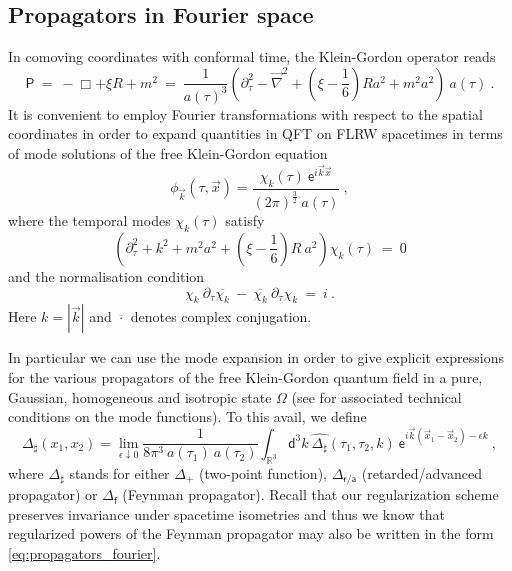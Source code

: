 \documentclass[11pt]{book}
\newcommand{\abs}[1]{\left|#1\right|}
\newcommand{\Psf}{\mathsf{P}}
\newcommand{\asf}{\mathsf{a}}
\newcommand{\dsf}{\mathsf{d}}
\newcommand{\esf}{\mathsf{e}}
\newcommand{\fsf}{\mathsf{f}}
\newcommand{\rsf}{\mathsf{r}}
\theoremstyle{break}
\begin{document}
\subsection{Propagators in Fourier space}


In comoving coordinates with conformal time, the Klein-Gordon operator reads
%
\begin{equation*}
\Psf \ = \ - \Box + \xi R + m^2 \ = \ \frac{1}{a(\tau)^3} \left(\partial^2_\tau-\vec{\nabla}^2 + \left(\xi-\frac16\right)R a^2+m^2a^2\right) \ a(\tau) \ .
\end{equation*}
%
It is convenient to employ Fourier transformations with respect to the spatial coordinates in order to expand quantities in QFT on FLRW spacetimes in terms of mode solutions of the free Klein-Gordon equation
%
\begin{equation*}
\phi_{\vec{k}}(\tau,\vec{x}) = \frac{\chi_k(\tau) \ \esf^{i\vec{k}\vec{x}}}{(2\pi)^{\frac32} \ a(\tau)} \ , 
\end{equation*}
%
where the temporal modes $\chi_k(\tau)$ satisfy
%
\begin{equation}
\left(\partial^2_\tau + k^2 + m^2 a^2 + \left( \xi - \frac16 \right) R \ a^2 \right) \chi_k(\tau) \ = \ 0
\label{eq:modes}
\end{equation}
%
and the normalisation condition
%
\begin{equation}
\chi_k \ \partial_\tau \overline{\chi_k} \ - \ \overline{\chi_k} \ \partial_\tau{\chi_k} \ = \ i \ .
\label{eq:modes_normal}
\end{equation}
%
Here $k = \abs{\vec{k}}$ and $\overline{\cdot}$ denotes complex conjugation.


In particular we can use the mode expansion in order to give explicit expressions for the various propagators of the free Klein-Gordon quantum field in a pure, Gaussian, homogeneous and isotropic state $\Omega$ (see \cite{pinamonti_initial_2011,zschoche_chaplygin_2014}
for associated technical conditions on the mode functions). To this avail, we define
%
\begin{equation}
\Delta_\sharp(x_1,x_2) = \lim_{\epsilon\downarrow 0} \frac{1}{8\pi^3 \ a(\tau_1) \ a(\tau_2)} \int_{\mathbb{R}^3} \dsf^3k \ \widehat{\Delta_\sharp}(\tau_1,\tau_2,k) \ \esf^{i\vec{k}(\vec{x}_1-\vec{x}_2)-\epsilon k} \ ,
\label{eq:propagators_fourier}
\end{equation}
%
where $\Delta_\sharp$ stands for either $\Delta_+$ (two-point function), $\Delta_{\rsf/\asf}$ (retarded/advanced propagator) or $\Delta_\fsf$ (Feynman propagator). Recall that our regularization scheme preserves invariance under spacetime isometries and thus we know that regularized powers of the Feynman propagator may also be written in the form \eqref{eq:propagators_fourier}.
\end{document}
